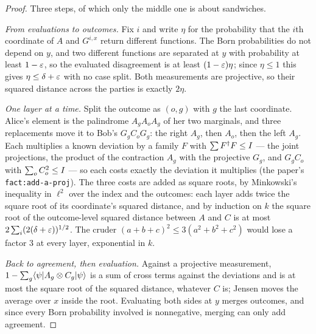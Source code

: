 \begin{proof}
\leanok
{}
Three steps, of which only the middle one is about sandwiches.

\emph{From evaluations to outcomes.} Fix $i$ and write $\eta$ for the probability that the $i$th
coordinate of $A$ and $G^{i,x}$ return different functions. The Born probabilities do not depend
on $y$, and two different functions are separated at $y$ with probability at least $1-\varepsilon$, so
the evaluated disagreement is at least $(1-\varepsilon)\eta$; since $\eta\leq 1$ this gives
$\eta\leq\delta+\varepsilon$ with no case split. Both measurements are projective, so their squared
distance across the parties is exactly $2\eta$.

\emph{One layer at a time.} Split the outcome as $(o, g)$ with $g$ the last coordinate. Alice's
element is the palindrome $A_g A_o A_g$ of her two marginals, and three replacements move it to
Bob's $G_g C_o G_g$: the right $A_g$, then $A_o$, then the left $A_g$. Each multiplies a known
deviation by a family $F$ with $\sum F^\dagger F\leq I$ --- the joint projections, the product of
the contraction $A_g$ with the projective $G_g$, and $G_g C_o$ with $\sum_o C_o^2\leq I$ --- so each
costs exactly the deviation it multiplies (the paper's \texttt{fact:add-a-proj}). The three costs
are added as square roots, by Minkowski's inequality in $\ell^2$ over the index and the outcomes:
each layer adds twice the square root of its coordinate's squared distance, and by induction on
$k$ the square root of the outcome-level squared distance between $A$ and $C$ is at most
$2\sum_i (2(\delta+\varepsilon))^{1/2}$. The cruder $(a+b+c)^2\leq 3(a^2+b^2+c^2)$ would lose a factor
$3$ at every layer, exponential in $k$.

\emph{Back to agreement, then evaluation.} Against a projective measurement,
$1-\sum_g\langle\psi|A_g\otimes C_g|\psi\rangle$ is a sum of cross terms against the deviations and is at
most the square root of the squared distance, whatever $C$ is; Jensen moves the average over $x$
inside the root. Evaluating both sides at $y$ merges outcomes, and since every Born probability
involved is nonnegative, merging can only add agreement.
\end{proof}

